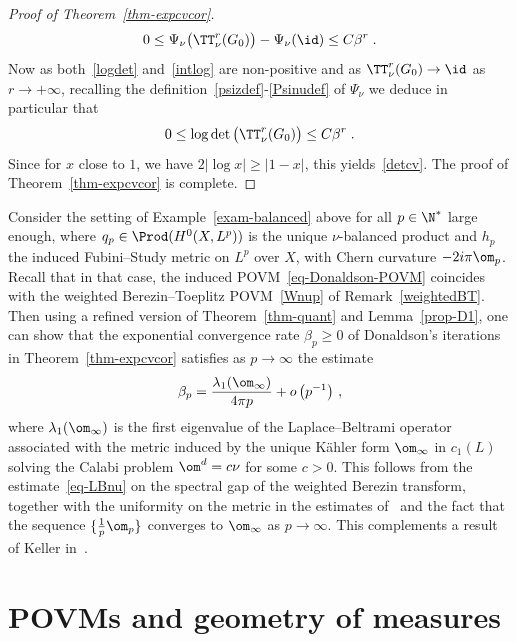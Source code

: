\begin{proof}[Proof of Theorem~\ref{thm-expcvcor}]
\begin{equation}
0\leq\Psi_\nu\big(\TT^r_\nu(G_0)\big)-\Psi_\nu(\id)\leq C\beta^r
\;.
\end{equation}
Now as both~\eqref{logdet} and~\eqref{intlog} are non-positive and as $\TT^r_\nu(G_0)\to\id$ as $r\to +\infty$, recalling the definition~\eqref{psizdef}-\eqref{Psinudef} of $\Psi_\nu$ we deduce in particular that
\begin{equation}
0\leq\log\det\big(\TT^r_\nu(G_0)\big)\leq C\beta^r\;.
\end{equation}
Since for $x$ close to $1$, we have $2|\log x | \geq |1-x|$, this yields~\eqref{detcv}. The proof of Theorem~\ref{thm-expcvcor} is complete.
\end{proof}


\begin{rema}\label{thmquantnu}
Consider the setting of Example~\ref{exam-balanced} above for all $p\in\N^*$ large enough, where $q_p\in\Prod(H^0(X,L^p))$ is the unique $\nu$-balanced product and $h_p$ the induced Fubini--Study metric on $L^p$ over $X$, with Chern curvature $-2i\pi\om_p$. Recall that in that case, the induced POVM~\eqref{eq-Donaldson-POVM} coincides with the weighted Berezin--Toeplitz POVM~\eqref{Wnup} of Remark~\ref{weightedBT}. Then using a refined version of Theorem~\ref{thm-quant} and Lemma~\ref{prop-D1}, one can show that the exponential convergence rate $\beta_p\geq 0$ of Donaldson's iterations in Theorem~\ref{thm-expcvcor} satisfies as $p\rightarrow\infty$ the estimate
\begin{equation}\label{thmquantunif}
\beta_p=\frac{\lambda_1(\om_\infty)}{4\pi p}+o\left(p^{-1}\right)\,,
\end{equation}
where $\lambda_1(\om_\infty)$ is the first eigenvalue of the Laplace--Beltrami operator associated with the metric induced by the unique K\"ahler form $\om_\infty$ in $c_1(L)$ solving the Calabi problem $\om^d=c\nu$ for some $c>0$. This follows from the estimate~\eqref{eq-LBnu} on the spectral gap of the weighted Berezin transform, together with the uniformity on the metric in the estimates of~\cite[Theorem~4.18']{DLM06} and the fact that the sequence $\{\frac{1}{p}\om_p\}$ converges to $\om_\infty$ as $p\rightarrow\infty$. This complements a result of Keller in~\cite[Proposition~4.7]{Keller09}.
\end{rema}



\section{POVMs and geometry of measures} \label{sec-bestfit}

